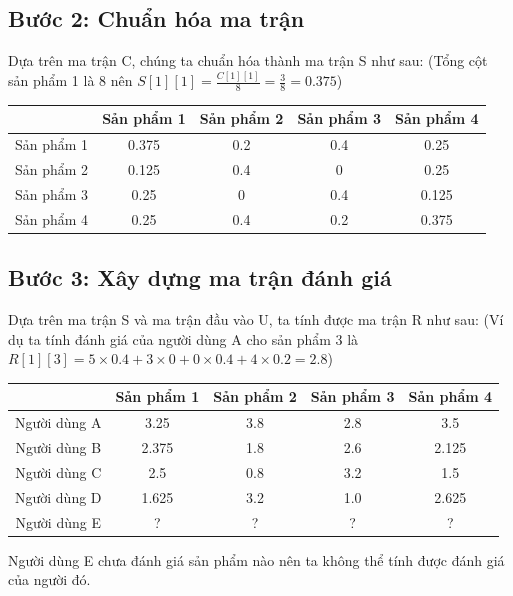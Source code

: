 \documentclass{report}
\begin{document}
\subsection*{Bước 2: Chuẩn hóa ma trận}
Dựa trên ma trận C, chúng ta chuẩn hóa thành ma trận S như sau:
(Tổng cột sản phẩm 1 là 8 nên $S[1][1] = \frac{C[1][1]}{8} = \frac{3}{8} = 0.375$)\\
\vspace{0.2cm}
{\centering
    \begin{tabular}{ |c|c|c|c|c| }
        \hline
                   & Sản phẩm 1 & Sản phẩm 2 & Sản phẩm 3 & Sản phẩm 4 \\
        \hline
        Sản phẩm 1 & 0.375      & 0.2        & 0.4        & 0.25       \\
        \hline
        Sản phẩm 2 & 0.125      & 0.4        & 0          & 0.25       \\
        \hline
        Sản phẩm 3 & 0.25       & 0          & 0.4        & 0.125      \\
        \hline
        Sản phẩm 4 & 0.25       & 0.4        & 0.2        & 0.375      \\
        \hline
    \end{tabular}
    \par}

\subsection*{Bước 3: Xây dựng ma trận đánh giá}
Dựa trên ma trận S và ma trận đầu vào U, ta tính được ma trận R như sau:
(Ví dụ ta tính đánh giá của người dùng A cho sản phẩm 3 là
$R[1][3] = 5 \times 0.4 + 3 \times 0 + 0 \times 0.4 + 4 \times 0.2 = 2.8$)\\
{\centering
\begin{tabular}{ |c|c|c|c|c| }
    \hline
                 & Sản phẩm 1 & Sản phẩm 2 & Sản phẩm 3 & Sản phẩm 4 \\
    \hline
    Người dùng A & 3.25       & 3.8        & 2.8        & 3.5        \\
    \hline
    Người dùng B & 2.375      & 1.8        & 2.6        & 2.125      \\
    \hline
    Người dùng C & 2.5        & 0.8        & 3.2        & 1.5        \\
    \hline
    Người dùng D & 1.625      & 3.2        & 1.0        & 2.625      \\
    \hline
    Người dùng E & ?          & ?          & ?          & ?          \\
    \hline
\end{tabular}
\par}
\vspace{0.2cm}
Người dùng E chưa đánh giá sản phẩm nào nên ta không thể tính được đánh giá của người đó.
\end{document}
